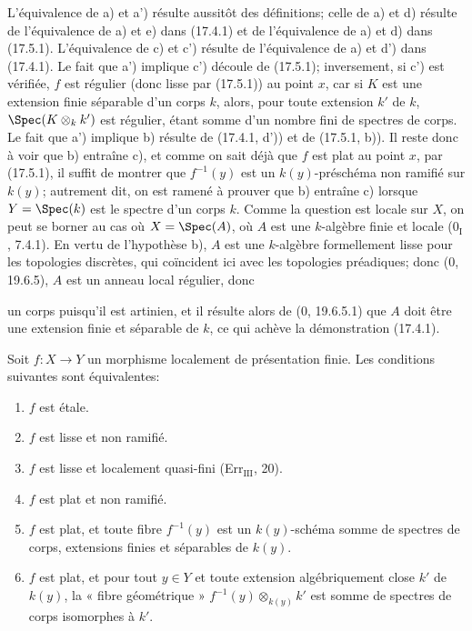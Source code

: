 L'équivalence de a) et a') résulte aussitôt des définitions; celle de a) et d) résulte de l'équivalence de a) et e) dans (17.4.1) et de l'équivalence de a) et d) dans (17.5.1). L'équivalence de c) et c') résulte de l'équivalence de a) et d') dans (17.4.1). Le fait que a') implique c') découle de (17.5.1); inversement, si c') est vérifiée, $f$ est régulier (donc lisse par (17.5.1)) au point $x$, car si $K$ est une extension finie séparable d'un corps $k$, alors, pour toute extension $k'$ de $k$, $\Spec(K\otimes_k k')$ est régulier, étant somme d'un nombre fini de spectres de corps. Le fait que a') implique b) résulte de (17.4.1, d')) et de (17.5.1, b)). Il reste donc à voir que b) entraîne c), et comme on sait déjà que $f$ est plat au point $x$, par (17.5.1), il suffit de montrer que $f^{-1}(y)$ est un $k(y)$-préschéma non ramifié sur $k(y)$; autrement dit, on est ramené à prouver que b) entraîne c) lorsque $Y=\Spec(k)$ est le spectre d'un corps $k$. Comme la question est locale sur $X$, on peut se borner au cas où $X=\Spec(A)$, où $A$ est une $k$-algèbre finie et locale ($0_{\mathrm I}$, 7.4.1). En vertu de l'hypothèse b), $A$ est une $k$-algèbre formellement lisse pour les topologies discrètes, qui coïncident ici avec les topologies préadiques; donc (0, 19.6.5), $A$ est un anneau local régulier, donc

un corps puisqu'il est artinien, et il résulte alors de (0, 19.6.5.1) que $A$ doit être une extension finie et séparable de $k$, ce qui achève la démonstration (17.4.1).

\begin{corollary}[17.6.2]
\label{IV.17.6.2}
Soit $f:X\to Y$ un morphisme localement de présentation finie. Les conditions suivantes sont équivalentes:
\begin{enumerate}
  \item[a)] $f$ est étale.
  \item[a')] $f$ est lisse et non ramifié.
  \item[b)] $f$ est lisse et localement quasi-fini (Err$_{\mathrm{III}}$, 20).
  \item[c)] $f$ est plat et non ramifié.
  \item[c')] $f$ est plat, et toute fibre $f^{-1}(y)$ est un $k(y)$-schéma somme de spectres de corps, extensions finies et séparables de $k(y)$.
  \item[c'')] $f$ est plat, et pour tout $y\in Y$ et toute extension algébriquement close $k'$ de $k(y)$, la « fibre géométrique » $f^{-1}(y)\otimes_{k(y)}k'$ est somme de spectres de corps isomorphes à $k'$.
\end{enumerate}
\end{corollary}

